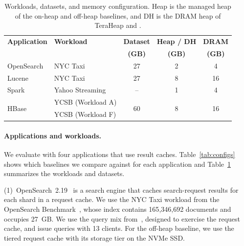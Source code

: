 \begin{table}[t]
	\center
	\small
	\setlength{\tabcolsep}{5pt}
	\caption{Workloads, datasets, and memory configuration.
		Heap is the managed heap of the on-heap and off-heap baselines, and DH is the DRAM heap of TeraHeap and \chipperName{}.}
	\label{tab:workloads}
	\begin{tabular}{@{}llccc@{}}
		\toprule
		\textbf{Application}   & \textbf{Workload} & \textbf{Dataset}    & \textbf{Heap / DH} & \textbf{DRAM}       \\
		                       &                   & \textbf{(GB)}       & \textbf{(GB)}      & \textbf{(GB)}       \\
		\midrule
		OpenSearch             & NYC Taxi          & 27                  & 2                  & 4                   \\
		Lucene                 & NYC Taxi          & 27                  & 8                  & 16                  \\
		Spark                  & Yahoo Streaming   & --                  & 1                  & 4                   \\
		\multirow{2}{*}{HBase} & YCSB (Workload A) & \multirow{2}{*}{60} & \multirow{2}{*}{8} & \multirow{2}{*}{16} \\
		                       & YCSB (Workload F) &                     &                    &                     \\
		\bottomrule
	\end{tabular}
\end{table}

\paragraph{\textbf{Applications and workloads.}}
We evaluate \chipperName{} with four applications that use result caches.
Table~\ref{tab:configs} shows which baselines we compare against for each application and Table~\ref{tab:workloads} summarizes the workloads and datasets.

(1)~OpenSearch~2.19~\cite{opensearch} is a search engine that caches search-request results for each shard in a request cache.
We use the NYC Taxi workload from the OpenSearch Benchmark~\cite{opensearch-benchmark}, whose index contains 165{,}346{,}692 documents and occupies \SI{27}{GB}.
We use the query mix from~\cite{opensearch:tiered-cache}, designed to exercise the request cache, and issue queries with 13 clients.
For the off-heap baseline, we use the tiered request cache with its storage tier on the NVMe SSD.

